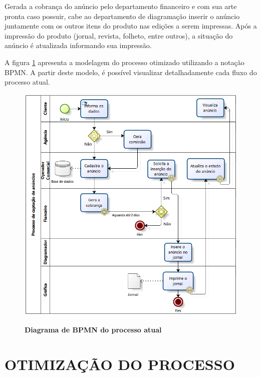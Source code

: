 \documentclass[
	12pt,				%
	openright,			%
	oneside,			%
	a4paper,			%
	chapter=TITLE,		%
	section=TITLE,		%
	english,			%
	french,				%
	spanish,			%
	brazil				%
	]{abntex2}
\begin{document}
Gerada a cobrança do anúncio pelo departamento financeiro e com sua arte pronta caso possuir, cabe ao departamento de diagramação inserir o anúncio juntamente com os outros itens do produto nas edições a serem impressas. Após a impressão do produto (jornal, revista, folheto, entre outros), a situação do anúncio é atualizada informando sua impressão.

A figura \ref{fig-bpmn-processo-atual} apresenta a modelagem do processo otimizado utilizando a notação BPMN. A partir deste modelo, é possível visualizar detalhadamente cada fluxo do processo atual.

\begin{figure}[h]
	\begin{center}
		\caption{
			\textbf{Diagrama de BPMN do processo atual}
		}\label{fig-bpmn-processo-atual}
		\includegraphics [scale=0.84]{imagens/bpmn_processo_atual.png}
		\label{fig-bpmn-processo-atual}
	\end{center}
\end{figure}


\section{OTIMIZAÇÃO DO PROCESSO}
\end{document}
